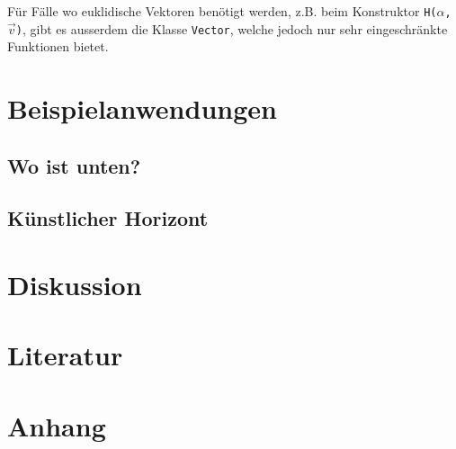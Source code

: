 \documentclass[12pt]{article}
\begin{document}
  Für Fälle wo euklidische Vektoren benötigt werden, z.B. beim Konstruktor \texttt{H($\alpha$, $\vec{v}$)}, gibt es ausserdem die Klasse \texttt{Vector}, welche jedoch nur sehr eingeschränkte Funktionen bietet.

  \section{Beispielanwendungen}
  \subsection{Wo ist unten?}
  \subsection{Künstlicher Horizont}

  \section{Diskussion}

  \section{Literatur}

  \section{Anhang}
\end{document}
